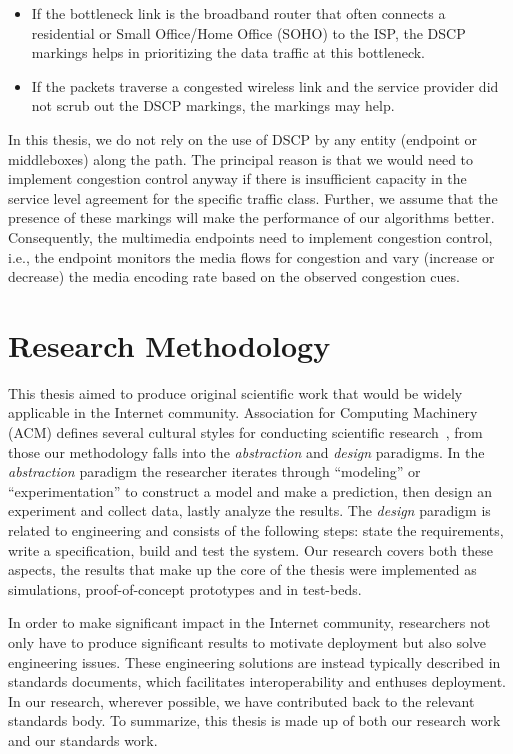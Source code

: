 \begin{itemize}

  \item If the bottleneck link is the broadband router that often connects a
  residential or Small Office/Home Office (SOHO) to the ISP, the DSCP markings
  helps in prioritizing the data traffic at this bottleneck.

  \item If the packets traverse a congested wireless link and the service
  provider did not scrub out the DSCP markings, the markings may help.

\end{itemize}

In this thesis, we do not rely on the use of DSCP by any entity (endpoint or
middleboxes) along the path. The principal reason is that we would need to
implement congestion control anyway if there is insufficient capacity in the
service level agreement for the specific traffic class. Further, we assume
that the presence of these markings will make the performance of our
algorithms better. Consequently, the multimedia endpoints need to implement
congestion control, i.e., the endpoint monitors the media flows for congestion
and vary (increase or decrease) the media encoding rate based on the observed
congestion cues.


\section{Research Methodology}

This thesis aimed to produce original scientific work that would be widely
applicable in the Internet community. Association for Computing Machinery
(ACM) defines several cultural styles for conducting scientific
research~\cite{Denning:CS.Method}, from those our methodology falls into the
\textit{abstraction} and \textit{design} paradigms. In the \emph{abstraction}
paradigm the researcher iterates through ``modeling'' or ``experimentation''
to construct a model and make a prediction, then design an experiment and
collect data, lastly analyze the results. The \emph{design} paradigm is
related to  engineering and consists of the following steps: state the
requirements, write a specification, build and test the system. Our research
covers both these aspects, the results that make up the core of the thesis
were implemented as simulations, proof-of-concept prototypes and in test-beds. 

In order to make significant impact in the Internet community, researchers not
only have to produce significant results to motivate deployment but also solve
engineering issues. These engineering solutions are instead typically
described in standards documents, which facilitates interoperability and
enthuses deployment. In our research, wherever possible, we have contributed
back to the relevant standards body. To summarize, this thesis is made up
of both our research work and our standards work.

